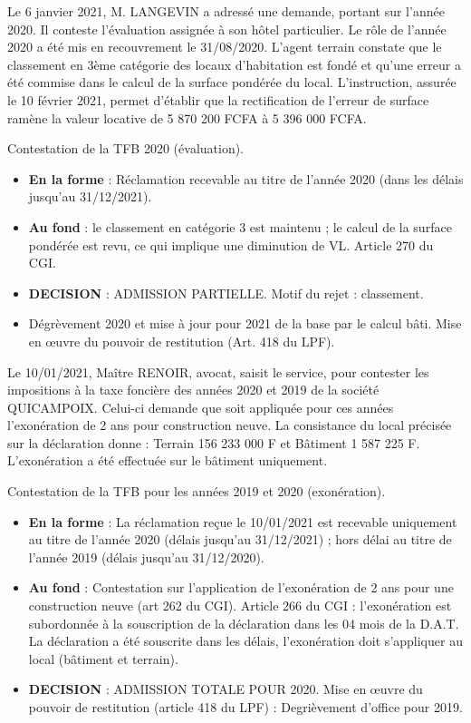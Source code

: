 \documentclass[a4paper, 12pt]{exam}
\begin{document}
\begin{questions}
	\question Le 6 janvier 2021, M. LANGEVIN a adressé une demande, portant sur l'année 2020. Il conteste l'évaluation assignée à son hôtel particulier. Le rôle de l'année 2020 a été mis en recouvrement le 31/08/2020. L'agent terrain constate que le classement en 3ème catégorie des locaux d'habitation est fondé et qu'une erreur a été commise dans le calcul de la surface pondérée du local. L'instruction, assurée le 10 février 2021, permet d'établir que la rectification de l'erreur de surface ramène la valeur locative de 5 870 200 FCFA à 5 396 000 FCFA.
	\begin{solution}
		Contestation de la TFB 2020 (évaluation).
		\begin{itemize}
			\item \textbf{En la forme} : Réclamation recevable au titre de l'année 2020 (dans les délais jusqu'au 31/12/2021).
			\item \textbf{Au fond} : le classement en catégorie 3 est maintenu ; le calcul de la surface pondérée est revu, ce qui implique une diminution de VL. Article 270 du CGI.
			\item \textbf{DECISION} : ADMISSION PARTIELLE. Motif du rejet : classement.
			\item Dégrèvement 2020 et mise à jour pour 2021 de la base par le calcul bâti. Mise en œuvre du pouvoir de restitution (Art. 418 du LPF).
		\end{itemize}
	\end{solution}
	
	\question Le 10/01/2021, Maître RENOIR, avocat, saisit le service, pour contester les impositions à la taxe foncière des années 2020 et 2019 de la société QUICAMPOIX. Celui-ci demande que soit appliquée pour ces années l'exonération de 2 ans pour construction neuve. La consistance du local précisée sur la déclaration donne : Terrain 156 233 000 F et Bâtiment 1 587 225 F. L'exonération a été effectuée sur le bâtiment uniquement.
	\begin{solution}
		Contestation de la TFB pour les années 2019 et 2020 (exonération).
		\begin{itemize}
			\item \textbf{En la forme} : La réclamation reçue le 10/01/2021 est recevable uniquement au titre de l'année 2020 (délais jusqu'au 31/12/2021) ; hors délai au titre de l'année 2019 (délais jusqu'au 31/12/2020).
			\item \textbf{Au fond} : Contestation sur l'application de l'exonération de 2 ans pour une construction neuve (art 262 du CGI). Article 266 du CGI : l'exonération est subordonnée à la souscription de la déclaration dans les 04 mois de la D.A.T. La déclaration a été souscrite dans les délais, l'exonération doit s'appliquer au local (bâtiment et terrain).
			\item \textbf{DECISION} : ADMISSION TOTALE POUR 2020. Mise en œuvre du pouvoir de restitution (article 418 du LPF) : Degrièvement d'office pour 2019.
		\end{itemize}
	\end{solution}
	

\end{questions}
\end{document}
